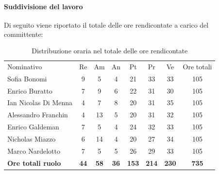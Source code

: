 \documentclass[../piano-di-progetto.tex]{subfiles}
\begin{document}
    \paragraph{Suddivisione del lavoro}
    Di seguito viene riportato il totale delle ore rendicontate a carico del committente:
    \begin{table}[H]
      \centering
      \begin{tabular}{lccccccc}
        Nominativo                & Re          & Am          & An          & Pt           & Pr           & Ve           & Ore totali   \\
        Sofia Bonomi              & 9           & 5           & 4           & 21           & 33           & 33           & 105          \\
        Enrico Buratto            & 7           & 9           & 6           & 22           & 31           & 30           & 105          \\
        Ian Nicolas Di Menna      & 4           & 7           & 8           & 20           & 31           & 35           & 105          \\
        Alessandro Franchin       & 4           & 13          & 5           & 20           & 31           & 32           & 105          \\
        Enrico Galdeman           & 7           & 5           & 4           & 24           & 32           & 33           & 105          \\
        Nicholas Miazzo           & 6           & 14          & 4           & 20           & 27           & 34           & 105          \\
        Marco Nardelotto          & 7           & 5           & 5           & 26           & 29           & 33           & 105          \\
        \textbf{Ore totali ruolo} & \textbf{44} & \textbf{58} & \textbf{36} & \textbf{153} & \textbf{214} & \textbf{230} & \textbf{735}
      \end{tabular}
      \caption{Distribuzione oraria nel totale delle ore rendicontate}
      \end{table}
  
\end{document}
